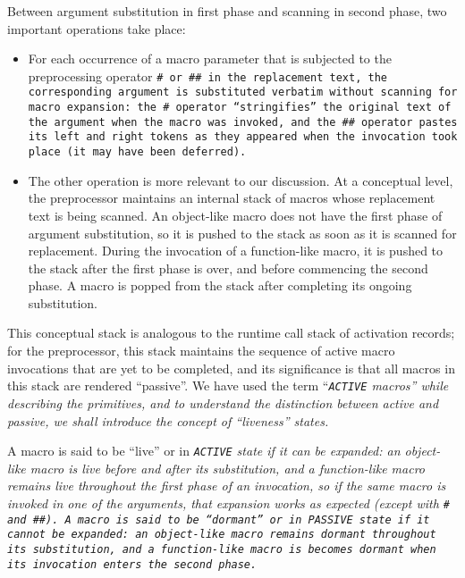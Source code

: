 Between argument substitution in first phase and scanning in second phase,
two important operations take place:

\begin{itemize}[nosep]

\item For each occurrence of a macro parameter that is subjected to
the preprocessing operator \tt{#} or \tt{##} in the replacement text,
the corresponding argument is substituted verbatim without scanning for macro
expansion: the \tt{#} operator ``stringifies'' the original text of the argument
when the macro was invoked, and the \tt{##} operator pastes its left and right
tokens as they appeared when the invocation took place (it may have been deferred).

\item The other operation is more relevant to our discussion.
At a conceptual level, the preprocessor maintains an internal
stack of macros whose replacement text is being scanned.
An object-like macro does not have the first phase of argument substitution,
so it is pushed to the stack as soon as it is scanned for replacement.
During the invocation of a function-like macro, it is pushed to the stack
after the first phase is over, and before commencing the second phase.
A macro is popped from the stack after completing its ongoing substitution.

\end{itemize}

This conceptual stack is analogous to the runtime call stack of
activation records; for the preprocessor, this stack maintains the
sequence of active macro invocations that are yet to be completed,
and its significance is that all macros in this stack are rendered ``passive''.
We have used the term ``\it{\tt{ACTIVE}} macros'' while describing the
primitives, and to understand the distinction between active and passive,
we shall introduce the concept of ``liveness'' states.

A macro is said to be ``live'' or in \it{\tt{ACTIVE}} state if it can be
expanded: an object-like macro is live before and after its substitution,
and a function-like macro remains live throughout the first phase of
an invocation, so if the same macro is invoked in one of the arguments,
that expansion works as expected (except with \tt{#} and \tt{##}).
A macro is said to be ``dormant'' or in \it{\tt{PASSIVE}} state if it cannot be
expanded: an object-like macro remains dormant throughout its substitution, and
a function-like macro is becomes dormant when its invocation enters the second phase.

